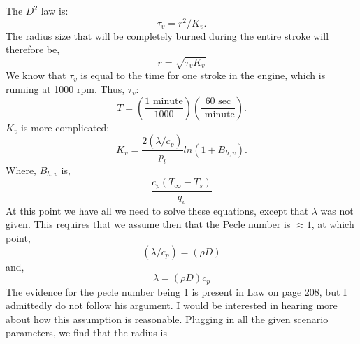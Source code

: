 \documentclass{article}
\begin{document}
The $D^2$ law is:
\begin{equation}
 \tau_v = r^2/ K_v.
\end{equation}
The radius size that will be completely burned during the entire stroke
will therefore be, 
\begin{equation}
 r = \sqrt{\tau_v K_v}
\end{equation}
We know that $\tau_v$ is equal to the time for one stroke in the engine,
which is running at 1000 rpm. Thus, $\tau_v$:
\begin{equation}
T = \left(\frac{1 \text{ minute}}{1000}\right) \left(\frac{60
     \text{ sec}}{\text{ minute}}\right).
\end{equation}
$K_v$ is more complicated:
\begin{equation}
K_v = \frac{2 (\lambda/c_p)}{p_l} ln(1+B_{h,v}).
\end{equation}
Where, $B_{h,v}$ is, 
\begin{equation}
\frac{c_p (T_\infty - T_s)}{q_v}
\end{equation}
At this point we have all we need to solve these equations, except that
$\lambda$ was not given. This requires that we assume then that the
Pecle number is $\approx 1$, at which point,
\begin{equation}
(\lambda/c_p) = (\rho D)
\end{equation}
and,
\begin{equation}
 \lambda = (\rho D)c_p
\end{equation}
The evidence for the pecle number being 1 is present in Law on page 208,
but I admittedly do not follow his argument. I would be interested in
hearing more about how this assumption is reasonable.
\newline
Plugging in all the given scenario parameters, we find that the radius
is 
\end{document}
